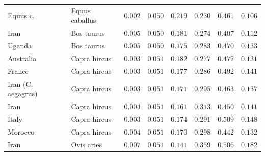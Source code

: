 \documentclass{article}
\begin{document}
\begin{center}
\begin{longtable*}{|l|l|r|r|r|r|r|r|}
            \bottomrule
            \endlastfoot
            Equus c. &      Equus caballus &               $ 0.002$ &             $ 0.050$ &              $ 0.219$ &                                     $ 0.230$ &                       $ 0.461$ &                 $ 0.106$ \\
            Iran &          Bos taurus &               $ 0.005$ &             $ 0.050$ &              $ 0.181$ &                                     $ 0.274$ &                       $ 0.407$ &                 $ 0.112$ \\
            Uganda &          Bos taurus &               $ 0.005$ &             $ 0.050$ &              $ 0.175$ &                                     $ 0.283$ &                       $ 0.470$ &                 $ 0.133$ \\
            Australia &        Capra hircus &               $ 0.003$ &             $ 0.051$ &              $ 0.182$ &                                     $ 0.277$ &                       $ 0.472$ &                 $ 0.131$ \\
            France &        Capra hircus &               $ 0.003$ &             $ 0.051$ &              $ 0.177$ &                                     $ 0.286$ &                       $ 0.492$ &                 $ 0.141$ \\
            Iran (C. aegagrus) &        Capra hircus &               $ 0.003$ &             $ 0.051$ &              $ 0.171$ &                                     $ 0.295$ &                       $ 0.463$ &                 $ 0.137$ \\
            Iran &        Capra hircus &               $ 0.004$ &             $ 0.051$ &              $ 0.161$ &                                     $ 0.313$ &                       $ 0.450$ &                 $ 0.141$ \\
            Italy &        Capra hircus &               $ 0.003$ &             $ 0.051$ &              $ 0.174$ &                                     $ 0.291$ &                       $ 0.509$ &                 $ 0.148$ \\
            Morocco &        Capra hircus &               $ 0.004$ &             $ 0.051$ &              $ 0.170$ &                                     $ 0.298$ &                       $ 0.442$ &                 $ 0.132$ \\
            Iran &          Ovis aries &               $ 0.007$ &             $ 0.051$ &              $ 0.141$ &                                     $ 0.359$ &                       $ 0.506$ &                 $ 0.182$ \\

\end{longtable*}
\end{center}
\end{document}
